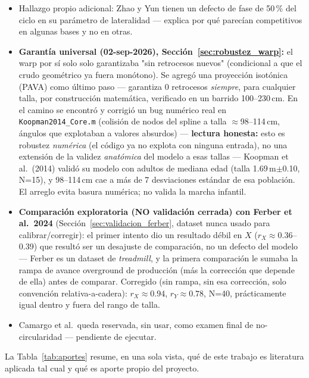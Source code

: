 \documentclass[11pt,a4paper]{scrartcl}
\begin{document}
\begin{itemize}
    \item Hallazgo propio adicional: Zhao y Yun tienen un defecto de fase de 50\,\% del ciclo en su parámetro de lateralidad --- explica por qué parecían competitivos en algunas bases y no en otras.
    \item \textbf{Garantía universal (02-sep-2026), Sección~\ref{sec:robustez_warp}:} el warp por sí solo solo garantizaba "sin retrocesos nuevos" (condicional a que el crudo geométrico ya fuera monótono). Se agregó una proyección isotónica (PAVA) como último paso --- garantiza 0 retrocesos \emph{siempre}, para cualquier talla, por construcción matemática, verificado en un barrido 100--230\,cm. En el camino se encontró y corrigió un bug numérico real en \texttt{Koopman2014\_Core.m} (colisión de nodos del spline a talla $\approx$98--114\,cm, ángulos que explotaban a valores absurdos) --- \textbf{lectura honesta:} esto es robustez \emph{numérica} (el código ya no explota con ninguna entrada), no una extensión de la validez \emph{anatómica} del modelo a esas tallas --- Koopman et al.\ (2014) validó su modelo con adultos de mediana edad (talla 1.69\,m$\pm$0.10, N=15), y 98--114\,cm cae a más de 7 desviaciones estándar de esa población. El arreglo evita basura numérica; no valida la marcha infantil.
    \item \textbf{Comparación exploratoria (NO validación cerrada) con Ferber et al.\ 2024} (Sección~\ref{sec:validacion_ferber}, dataset nunca usado para calibrar/corregir): el primer intento dio un resultado débil en $X$ ($r_X\approx0.36$--0.39) que resultó ser un desajuste de comparación, no un defecto del modelo --- Ferber es un dataset de \emph{treadmill}, y la primera comparación le sumaba la rampa de avance overground de producción (más la corrección que depende de ella) antes de comparar. Corregido (sin rampa, sin esa corrección, solo convención relativa-a-cadera): $r_X\approx0.94$, $r_Y\approx0.78$, N=40, prácticamente igual dentro y fuera del rango de talla.
    \item Camargo et al.\ queda reservada, sin usar, como examen final de no-circularidad --- pendiente de ejecutar.
\end{itemize}

La Tabla~\ref{tab:aportes} resume, en una sola vista, qué de este trabajo es literatura aplicada tal cual y qué es aporte propio del proyecto.
\end{document}
